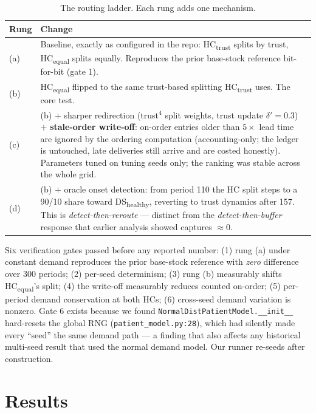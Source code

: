 \documentclass[11pt]{article}
\newcommand{\dsh}{DS\textsubscript{healthy}}
\newcommand{\hct}{HC\textsubscript{trust}}
\newcommand{\hce}{HC\textsubscript{equal}}
\begin{document}
\begin{table}[h]
\centering\small
\caption{The routing ladder. Each rung adds one mechanism.}
\begin{tabular}{lp{11.5cm}}
\toprule
\textbf{Rung} & \textbf{Change} \\
\midrule
(a) & Baseline, exactly as configured in the repo: \hct{} splits by trust, \hce{} splits
      equally. Reproduces the prior base-stock reference bit-for-bit (gate 1). \\
(b) & \hce{} flipped to the same trust-based splitting \hct{} uses. The core test. \\
(c) & (b) $+$ sharper redirection (trust$^{4}$ split weights, trust update $\delta'=0.3$)
      $+$ \textbf{stale-order write-off}: on-order entries older than $5\times$ lead time are
      ignored by the ordering computation (accounting-only; the ledger is untouched, late
      deliveries still arrive and are costed honestly). Parameters tuned on tuning seeds
      only; the ranking was stable across the whole grid. \\
(d) & (b) $+$ oracle onset detection: from period 110 the HC split steps to a 90/10 share
      toward \dsh{}, reverting to trust dynamics after 157. This is
      \emph{detect-then-reroute} --- distinct from the \emph{detect-then-buffer} response
      that earlier analysis showed captures $\approx$0. \\
\bottomrule
\end{tabular}
\end{table}

Six verification gates passed before any reported number: (1) rung (a) under constant demand
reproduces the prior base-stock reference with \emph{zero} difference over 300 periods;
(2) per-seed determinism; (3) rung (b) measurably shifts \hce{}'s split; (4) the write-off
measurably reduces counted on-order; (5) per-period demand conservation at both HCs;
(6) cross-seed demand variation is nonzero. Gate 6 exists because we found
\texttt{NormalDistPatientModel.\_\_init\_\_} hard-resets the global RNG
(\texttt{patient\_model.py:28}), which had silently made every ``seed'' the same demand path
--- a finding that also affects any historical multi-seed result that used the normal demand
model. Our runner re-seeds after construction.

\section{Results}
\end{document}
